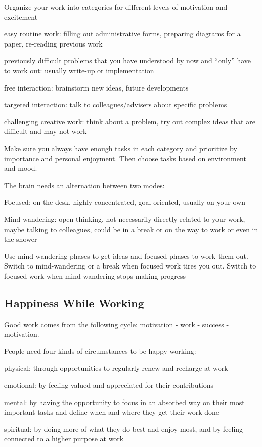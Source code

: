 \documentclass[12pt]{article}
\begin{document}
Organize your work into categories for different levels of motivation and excitement
\begin{compactitem}
 \item easy routine work: filling out administrative forms, preparing diagrams for a paper, re-reading previous work
 \item previously difficult problems that you have understood by now and ``only'' have to work out: usually write-up or implementation
 \item free interaction: brainstorm new ideas, future developments
 \item targeted interaction: talk to colleagues/advisers about specific problems
 \item challenging creative work: think about a problem, try out complex ideas that are difficult and may not work
\end{compactitem}
Make sure you always have enough tasks in each category and prioritize by importance and personal enjoyment.
Then choose tasks based on environment and mood.
\medskip

The brain needs an alternation between two modes:
\begin{compactitem}
\item Focused: on the desk, highly concentrated, goal-oriented, usually on your own
\item Mind-wandering: open thinking, not necessarily directly related to your work, maybe talking to colleagues, could be in a break or on the way to work or even in the shower
\end{compactitem}
Use mind-wandering phases to get ideas and focused phases to work them out.
Switch to mind-wandering or a break when focused work tires you out.
Switch to focused work when mind-wandering stops making progress

\subsection{Happiness While Working}

Good work comes from the following cycle: motivation - work - success - motivation.
\medskip

People need four kinds of circumstances to be happy working:
\begin{compactitem}
\item physical: through opportunities to regularly renew and recharge at work
\item emotional: by feeling valued and appreciated for their contributions
\item mental: by having the opportunity to focus in an absorbed way on their most important tasks and define when and where they get their work done
\item spiritual: by doing more of what they do best and enjoy most, and by feeling connected to a higher purpose at work
\end{compactitem}
\medskip
\end{document}
